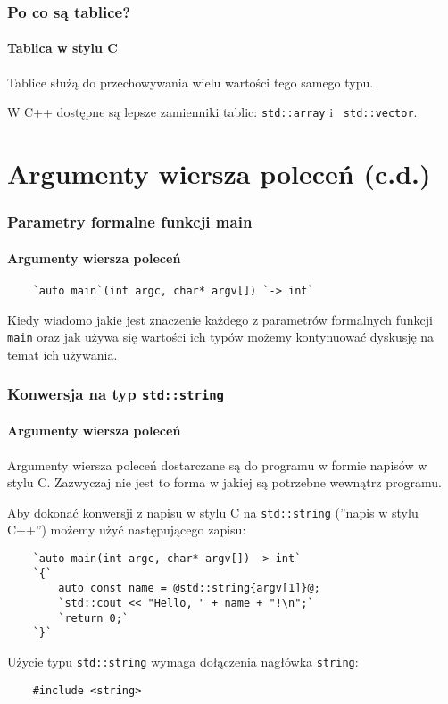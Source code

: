 \documentclass[aspectratio=169]{beamer}
\begin{document}
\begin{frame}
    \frametitle{Po co są tablice?}
    \framesubtitle{Tablica w stylu C}

    Tablice służą do przechowywania wielu wartości tego samego typu.

    \vspace{1em}

    W C++ dostępne są lepsze zamienniki tablic: {\tt std::array} i {\tt
    std::vector}.
\end{frame}

\section{Argumenty wiersza poleceń (c.d.)}

\begin{frame}[fragile]
    \frametitle{Parametry formalne funkcji main}
    \framesubtitle{Argumenty wiersza poleceń}

    \vspace{1em}
    \begin{lstlisting}
    `auto main`(int argc, char* argv[]) `-> int`
    \end{lstlisting}
    \vspace{1em}

    Kiedy wiadomo jakie jest znaczenie każdego z parametrów formalnych funkcji
    {\tt main} oraz jak używa się wartości ich typów możemy kontynuować dyskusję
    na temat ich używania.
\end{frame}

\begin{frame}[fragile]
    \frametitle{Konwersja na typ {\tt std::string}}
    \framesubtitle{Argumenty wiersza poleceń}

    Argumenty wiersza poleceń dostarczane są do programu w formie napisów w
    stylu C. Zazwyczaj nie jest to forma w jakiej są potrzebne wewnątrz
    programu.

    Aby dokonać konwersji z napisu w stylu C na {\tt std::string} (''napis w
    stylu C++'') możemy użyć następującego zapisu:

    \begin{lstlisting}
    `auto main(int argc, char* argv[]) -> int`
    `{`
        auto const name = @std::string{argv[1]}@;
        `std::cout << "Hello, " + name + "!\n";`
        `return 0;`
    `}`
    \end{lstlisting}

    Użycie typu {\tt std::string} wymaga dołączenia nagłówka {\tt string}:
    \begin{lstlisting}
    #include <string>
    \end{lstlisting}
\end{frame}
\end{document}
